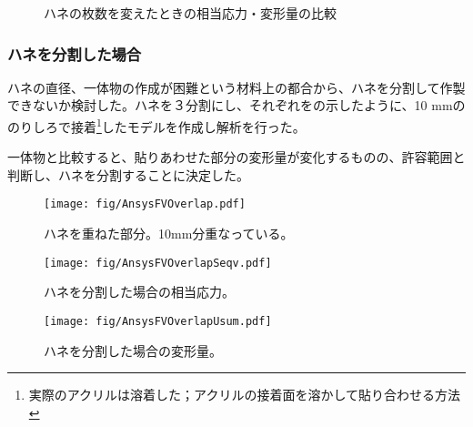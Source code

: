 \begin{figure}[htbp]
  \begin{minipage}{0.47\textwidth}
  \end{minipage}
  \hfill
  \begin{minipage}{0.47\textwidth}
  \end{minipage}
    \caption{ハネの枚数を変えたときの相当応力・変形量の比較}
  \label{AnsysFVCirc2}
\end{figure}



\subsubsection{ハネを分割した場合}
ハネの直径、一体物の作成が困難という材料上の都合から、ハネを分割して作製できないか検討した。ハネを３分割にし、それぞれをの示したように、10 mmののりしろで接着\footnote{実際のアクリルは溶着した；アクリルの接着面を溶かして貼り合わせる方法}したモデルを作成し解析を行った。

一体物と比較すると、貼りあわせた部分の変形量が変化するものの、許容範囲と判断し、ハネを分割することに決定した。

\begin{figure}[htbp]
\centering
\texttt{[image: fig/AnsysFVOverlap.pdf]}
\caption[ハネを重ねた部分]{ハネを重ねた部分。10mm分重なっている。}
\label{AnsysFVOverlap}
\end{figure}

\begin{figure}[htbp]
\begin{minipage}{0.47\textwidth}
\centering
\texttt{[image: fig/AnsysFVOverlapSeqv.pdf]}
\caption[ハネを分割した場合の相当応力]{ハネを分割した場合の相当応力。}
\label{AnsysFVOverlapSeqv}
\end{minipage}
\hfill
\begin{minipage}{0.47\textwidth}
\centering
\texttt{[image: fig/AnsysFVOverlapUsum.pdf]}
\caption[ハネを分割した場合の変形量]{ハネを分割した場合の変形量。}
\label{AnsysFVOverlapUsum}
\end{minipage}
\end{figure}
\fi%


